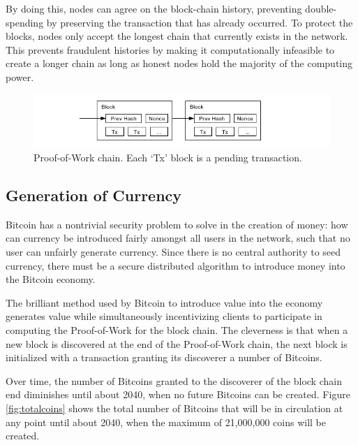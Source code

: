 \documentclass{report}
\begin{document}
    By doing this, nodes can agree on the block-chain history, preventing double-spending by preserving the transaction that has already occurred. To protect the blocks, nodes only accept the longest chain that currently exists in the network. This prevents fraudulent histories by making it computationally infeasible to create a longer chain as long as honest nodes hold the majority of the computing power.

    \begin{figure}[h]
      \begin{center}
        \includegraphics{images/blockchain.png}
        \caption{Proof-of-Work chain. Each `Tx' block is a pending transaction. \cite{Nakamoto:Bitcoin}}
        \label{fig:blockchain}
      \end{center}
    \end{figure}

\subsection*{Generation of Currency}
Bitcoin has a nontrivial security problem to solve in the creation of money: how
can currency be introduced fairly amongst all users in the network, such that no
user can unfairly generate currency. Since there is no central authority to seed
currency, there must be a secure distributed algorithm to introduce money into
the Bitcoin economy.

The brilliant method used by Bitcoin to introduce value into the economy
generates value while simultaneously incentivizing clients to participate in
computing the Proof-of-Work for the block chain. The cleverness is that when a
new block is discovered at the end of the Proof-of-Work chain, the next block is
initialized with a transaction granting its discoverer a number of Bitcoins.

Over time, the number of Bitcoins granted to the discoverer of the block chain
end diminishes until about 2040, when no future Bitcoins can be created. Figure
\ref{fig:totalcoins} shows the total number of Bitcoins that will be in
circulation at any point until about 2040, when the maximum of 21,000,000 coins
will be created.
\end{document}
